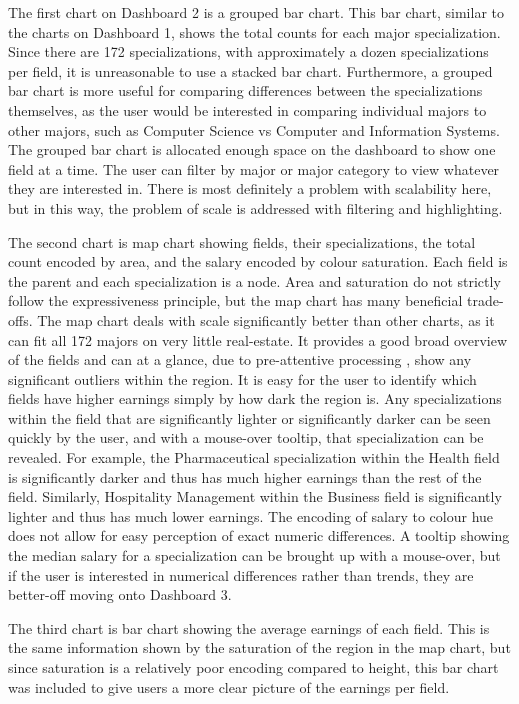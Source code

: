 \documentclass[sigchi]{acmart}
\begin{document}
The first chart on Dashboard 2 is a grouped bar chart. This bar chart, similar to the charts on Dashboard 1, shows the total counts for each major specialization. Since there are 172 specializations, with approximately a dozen specializations per field, it is unreasonable to use a stacked bar chart. Furthermore, a grouped bar chart is more useful for comparing differences between the specializations themselves, as the user would be interested in comparing individual majors to other majors, such as Computer Science vs Computer and Information Systems. The grouped bar chart is allocated enough space on the dashboard to show one field at a time. The user can filter by major or major category to view whatever they are interested in. There is most definitely a problem with scalability here, but in this way, the problem of scale is addressed with filtering and highlighting. 

The second chart is map chart showing fields, their specializations, the total count encoded by area, and the salary encoded by colour saturation. Each field is the parent and each specialization is a node. Area and saturation do not strictly follow the expressiveness principle, but the map chart has many beneficial trade-offs. The map chart deals with scale significantly better than other charts, as it can fit all 172 majors on very little real-estate. It provides a good broad overview of the fields and can at a glance, due to pre-attentive processing \cite{munzner}, show any significant outliers within the region. It is easy for the user to identify which fields have higher earnings simply by how dark the region is. Any specializations within the field that are significantly lighter or significantly darker can be seen quickly by the user, and with a mouse-over tooltip, that specialization can be revealed. For example, the Pharmaceutical specialization within the Health field is significantly darker and thus has much higher earnings than the rest of the field. Similarly, Hospitality Management within the Business field is significantly lighter and thus has much lower earnings. The encoding of salary to colour hue does not allow for easy perception of exact numeric differences. A tooltip showing the median salary for a specialization can be brought up with a mouse-over, but if the user is interested in numerical differences rather than trends, they are better-off moving onto Dashboard 3.

The third chart is bar chart showing the average earnings of each field. This is the same information shown by the saturation of the region in the map chart, but since saturation is a relatively poor encoding compared to height, this bar chart was included to give users a more clear picture of the earnings per field.
\end{document}
